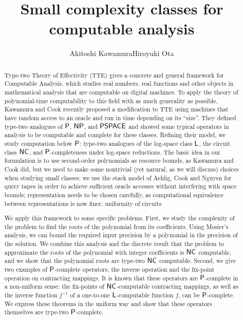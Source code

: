 \documentclass[envcountsame,orivec,oribibl]{llncs}
\title{Small complexity classes for computable analysis}
\author{Akitoshi Kawamura\qquad\qquad Hiroyuki Ota}
\institute{University of Tokyo}
\begin{document}
\maketitle

\begin{abstract}
Type-two Theory of Effectivity (TTE) gives a concrete and general framework for 
Computable Analysis, 
which studies 
real numbers, real functions and other objects in mathematical analysis
that are computable on digital machines. 
To apply the theory of polynomial-time computability
to this field with as much generality as possible, 
Kawamura and Cook recently proposed a modification to TTE using 
machines that have random access to an oracle and 
run in time depending on its ``size''. 
They defined type-two analogues of 
$\mathsf{P}$, $\mathsf{NP}$, and $\mathsf{PSPACE}$ 
and showed some typical operators in analysis
to be computable and complete for these classes. 
Refining their model, 
we study computation below $\mathsf{P}$: 
type-two analogues of 
the log-space class $\mathsf{L}$, 
the circuit class $\mathsf{NC}$, 
and $\mathsf{P}$-completeness under log-space reductions.
The basic idea in our formulation is 
to use second-order polynomials as resource bounds, 
as Kawamura and Cook did, 
but we need to make some nontrivial (yet natural, as we will discuss) choices
when studying small classes: 
we use the stack model of Aehlig, Cook and Nguyen for query tapes 
in order to achieve 
sufficient oracle accesses without interfering with space bounds; 
representation needs to be chosen carefully, as 
computational equivalence between representations is now finer; 
uniformity of circuits 

We apply this framework to some specific problems.
First, we study the complexity of the problem to find the roots of
the polynomial from its coefficients.
Using Mosier's analysis, we can bound the required input precision 
by a polynomial in the precision of the solution.
We combine this analysis and the discrete result 
that the problem to approximate the roots of the polynomial with integer 
coefficients is $\mathsf{NC}$ computable,
and we show that the polynomial roots are type-two $\mathsf{NC}$ computable.
Second, we give two examples of $\mathsf{P}$-complete operators,
the inverse operation and the fix-point operation on contracting mappings.
It is known that these operators are $\mathsf{P}$-complete in a non-uniform sense:
the fix-points of $\mathsf{NC}$-computable contracting mappings,
as well as the inverse function $f^{-1}$ of a one-to-one $\mathsf{L}$-computable function $f$,
can be $\mathsf{P}$-complete.
We express these theorems in the uniform way and
show that these operators themselves are type-two $\mathsf{P}$-complete.
\end{abstract}
\end{document}
